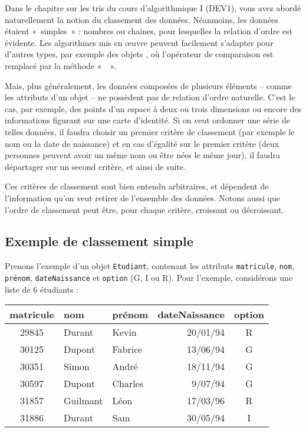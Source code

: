 	Dans le chapitre sur les tris du cours d'algorithmique I (DEV1), 
	vous avez abordé naturellement la notion du classement des données. 
	Néanmoins, les données étaient «~simples~» : 
	nombres ou chaines, pour lesquelles la relation d’ordre est évidente. 
	Les algorithmes mis en œuvre peuvent facilement s’adapter pour d’autres types, 
	par exemple des objets , où l’opérateur de comparaison est remplacé par la méthode
	«~~».
	
	Mais, plus généralement, les données composées de plusieurs
	éléments -- comme les attributs d'un objet -- 
	ne possèdent pas de relation d’ordre naturelle. 
	C'est le cas, par exemple, des points d’un espace à deux ou trois dimensions
	ou encore des informations figurant sur une carte d’identité. 
	Si on veut ordonner une série de telles données, 
	il faudra choisir un premier critère de classement 
	(par exemple le nom ou la date de naissance) 
	et en cas d’égalité sur le premier critère 
	(deux personnes peuvent avoir un même nom ou être nées le même jour), 
	il faudra départager sur un second critère, 
	et ainsi de suite.
	
	Ces critères de classement sont bien entendu arbitraires, 
	et dépendent de l’information qu’on veut retirer de l’ensemble des données. 
	Notons aussi que l’ordre de classement peut être, pour chaque critère, 
	croissant ou décroissant.

\subsection*{Exemple de classement simple}

	Prenons l’exemple d’un objet \texttt{Etudiant}, 
	contenant les attributs \texttt{matricule}, \texttt{nom}, \texttt{prénom}, 
	\texttt{dateNaissance} et \texttt{option} (G, I ou R). 
	Pour l’exemple, considérons une liste de 6 étudiants :
	
	\begin{center}
	\small\sffamily
	\begin{tabular}{cllrc}
		matricule 	& nom 		& prénom 	& dateNaissance & option \\
		\hline 
		29845     	& Durant 	& Kevin 	& 20/01/94 		& R\\
		30125 		& Dupont	& Fabrice 	& 13/06/94 		& G\\
		30351 		& Simon 	& André 	& 18/11/94 		& G\\
		30597 		& Dupont 	& Charles 	& 9/07/94 		& G\\
		31857 		& Guilmant  & Léon 		& 17/03/96 		& R\\
		31886 		& Durant  	& Sam 		& 30/05/94 		& I\\
		\hline 
	\end{tabular}
	\end{center}
	
